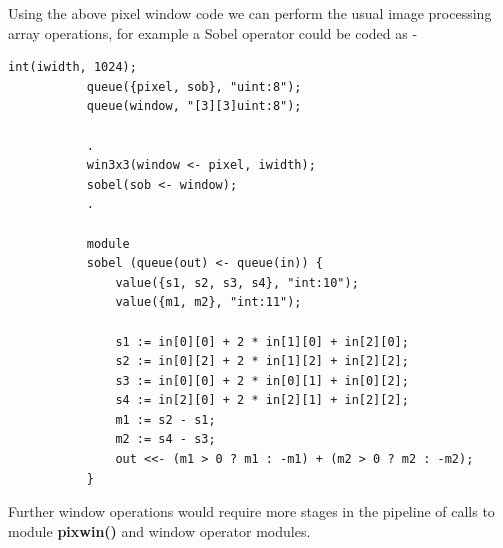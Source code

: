         Using the above pixel window code we can perform the usual image processing
        array operations, for example a Sobel operator could be coded as -
        \begin{lstlisting}[gobble=8, language=threepl]
           int(iwidth, 1024);
           queue({pixel, sob}, "uint:8");
           queue(window, "[3][3]uint:8");
           
           .
           win3x3(window <- pixel, iwidth);
           sobel(sob <- window);
           .
           
           module
           sobel (queue(out) <- queue(in)) {
               value({s1, s2, s3, s4}, "int:10");
               value({m1, m2}, "int:11");
               
               s1 := in[0][0] + 2 * in[1][0] + in[2][0];
               s2 := in[0][2] + 2 * in[1][2] + in[2][2];
               s3 := in[0][0] + 2 * in[0][1] + in[0][2];
               s4 := in[2][0] + 2 * in[2][1] + in[2][2];
               m1 := s2 - s1;
               m2 := s4 - s3;
               out <<- (m1 > 0 ? m1 : -m1) + (m2 > 0 ? m2 : -m2);
           }
        \end{lstlisting}
        Further window operations would require more stages in the pipeline
        of calls to module {\bf pixwin()} and window operator modules.
        
